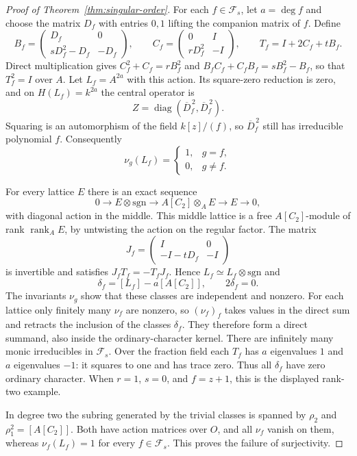 \begin{proof}[Proof of Theorem~\ref{thm:singular-order}]
For each $f\in\mathcal F_s$, let $a=\deg f$ and choose the
matrix $D_f$ with entries $0,1$ lifting the companion matrix of $f$.  Define
\[
 B_f=\begin{pmatrix}D_f&0\\sD_f^2-D_f&-D_f\end{pmatrix},\qquad
 C_f=\begin{pmatrix}0&I\\rD_f^2&-I\end{pmatrix},\qquad
 T_f=I+2C_f+tB_f.
\]
Direct multiplication gives
$C_f^2+C_f=rB_f^2$ and $B_fC_f+C_fB_f=sB_f^2-B_f$, so that $T_f^2=I$ over
$A$.  Let $L_f=A^{2a}$ with this action.  Its square-zero reduction is
zero, and on $H(L_f)=k^{2a}$ the central operator is
\[
 Z=\operatorname{diag}(\overline D_f^{\,2},\overline D_f^{\,2}).
\]
Squaring is an automorphism of the field $k[z]/(f)$, so
$\overline D_f^{\,2}$ still has irreducible polynomial $f$.  Consequently
\[
 \nu_g(L_f)=\begin{cases}1,&g=f,\\0,&g\ne f.\end{cases}
\]

For every lattice $E$ there is an exact sequence
\[
 0\longrightarrow E\otimes\mathrm{sgn}
 \longrightarrow A[C_2]\otimes_A E
 \longrightarrow E\longrightarrow0,
\]
with diagonal action in the middle.  This middle lattice is a free
$A[C_2]$-module of rank $\operatorname{rank}_A E$, by untwisting the
action on the regular factor.  The matrix
\[
 J_f=\begin{pmatrix}I&0\\-I-tD_f&-I\end{pmatrix}
\]
is invertible and satisfies $J_fT_f=-T_fJ_f$.  Hence
$L_f\simeq L_f\otimes\mathrm{sgn}$ and
\[
 \delta_f=[L_f]-a[A[C_2]],\qquad 2\delta_f=0.
\]
The invariants $\nu_g$ show that these classes are independent and
nonzero.  For each lattice only finitely many $\nu_f$ are nonzero, so
$(\nu_f)_f$ takes values in the direct sum and retracts the inclusion
of the classes $\delta_f$.  They therefore form a direct summand, also
inside the ordinary-character kernel.  There are infinitely many monic
irreducibles in $\mathcal F_s$.
Over the fraction field each $T_f$ has $a$ eigenvalues $1$ and $a$
eigenvalues $-1$: it squares to one and has trace zero.  Thus all
$\delta_f$ have zero ordinary character.  When $r=1$, $s=0$, and $f=z+1$, this is the displayed rank-two example.

In degree two the subring generated by the trivial classes is spanned
by $\rho_2$ and $\rho_1^2=[A[C_2]]$.  Both have action matrices over
$O$, and all $\nu_f$ vanish on them, whereas $\nu_f(L_f)=1$ for every $f\in\mathcal F_s$.
This proves the failure of surjectivity.


\end{proof}
